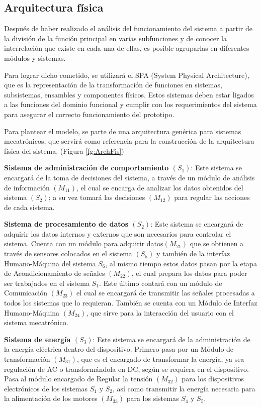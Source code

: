 \subsection{Arquitectura física}
Después de haber realizado el análisis del funcionamiento del sistema a partir de la división de la función principal en varias subfunciones y de conocer la interrelación que existe en cada una de ellas, es posible agruparlas en diferentes módulos y sistemas. 

Para lograr dicho cometido, se utilizará el SPA (System Physical Architecture), que es la representación de la transformación de funciones en sistemas, subsistemas, ensambles y componentes físicos. \cite{Flores2018} Estos sistemas deben estar ligados a las funciones del dominio funcional y cumplir con los requerimientos del sistema para asegurar el correcto funcionamiento del prototipo.

Para plantear el modelo, se parte de una arquitectura genérica para sistemas mecatrónicos, que servirá como referencia para la construcción de la arquitectura física del sistema. (Figura \ref{fg:ArchFis})

\textbf{Sistema de administración de comportamiento $(S_1)$}: Este sistema se encargará de la toma de decisiones del sistema, a través de un módulo de análisis de información $(M_{11})$, el cual se encarga de analizar los datos obtenidos del sistema $(S_2)$; a su vez tomará las decisiones $(M_{12})$ para regular las acciones de cada sistema. 

\textbf{Sistema de procesamiento de datos $(S_2)$}: Este sistema se encargará de adquirir los datos internos y externos que son necesarios para controlar el sistema. Cuenta con un módulo para adquirir datos$(M_{21})$ que se obtienen a través de sensores colocados en el sistema $(S_5)$ y también de la interfaz Humano-Máquina del sistema $S_6$, al mismo tiempo estos datos pasan por la etapa de Acondicionamiento de señales $(M_{22})$, el cual prepara los datos para poder ser trabajados en el sistema $S_1$. Este último contará con un módulo de Comunicación $(M_{23})$ el cual se encargará de transmitir las señales procesadas a todos los sistemas que lo requieran. También se cuenta con un Módulo de Interfaz Humano-Máquina $(M_{24})$, que sirve para la interacción del usuario con el sistema mecatrónico.

\textbf{Sistema de energía $(S_3)$}: Este sistema se encargará de la administración de la energía eléctrica dentro del dispositivo. Primero pasa por un Módulo de transformación $(M_{31})$, que es el encargado de transformar la energía, ya sea regulación de AC o transformándola en DC, según se requiera en el dispositivo. Pasa al módulo encargado de Regular la tensión $(M_{32})$ para los dispositivos electrónicos de los sistemas $S_1$ y $S_2$, así como transmitir la energía necesaria para la alimentación de los motores $(M_{33})$ para los sistemas $S_4$ y $S_5$.

